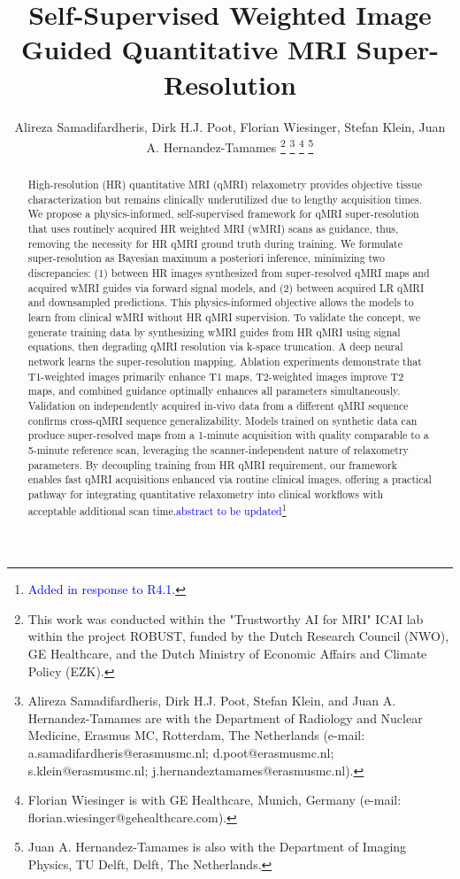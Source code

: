 \documentclass[journal,twoside,web]{ieeecolor}
\newcommand{\added}[1]{\textcolor{blue}{#1}}      %
\begin{document}
\title{Self-Supervised Weighted Image Guided Quantitative MRI Super-Resolution}
\author{
    Alireza Samadifardheris, 
    Dirk H.J. Poot, 
    Florian Wiesinger, 
    Stefan Klein, 
    Juan A. Hernandez-Tamames
    \thanks{This work was conducted within the "Trustworthy AI for MRI" ICAI lab within the project ROBUST, funded by the Dutch Research Council (NWO), GE Healthcare, and the Dutch Ministry of Economic Affairs and Climate Policy (EZK).}
    \thanks{Alireza Samadifardheris, Dirk H.J. Poot, Stefan Klein, and Juan A. Hernandez-Tamames are with the Department of Radiology and Nuclear Medicine, Erasmus MC, Rotterdam, The Netherlands (e-mail: a.samadifardheris@erasmusmc.nl; d.poot@erasmusmc.nl; s.klein@erasmusmc.nl; j.hernandeztamames@erasmusmc.nl).}
    \thanks{Florian Wiesinger is with GE Healthcare, Munich, Germany (e-mail: florian.wiesinger@gehealthcare.com).}
    \thanks{Juan A. Hernandez-Tamames is also with the Department of Imaging Physics, TU Delft, Delft, The Netherlands.}
}

\maketitle

\begin{abstract}
High-resolution (HR) quantitative MRI (qMRI) relaxometry provides objective tissue characterization but remains clinically underutilized due to lengthy acquisition times. We propose a physics-informed, self-supervised framework for qMRI super-resolution that uses routinely acquired HR weighted MRI (wMRI) scans as guidance, thus, removing the necessity for HR qMRI ground truth during training. We formulate super-resolution as Bayesian maximum a posteriori inference, minimizing two discrepancies: (1) between HR images synthesized from super-resolved qMRI maps and acquired wMRI guides via forward signal models, and (2) between acquired LR qMRI and downsampled predictions. This physics-informed objective allows the models to learn from clinical wMRI without HR qMRI supervision. To validate the concept, we generate training data by synthesizing wMRI guides from HR qMRI using signal equations, then degrading qMRI resolution via k-space truncation. A deep neural network learns the super-resolution mapping. Ablation experiments demonstrate that T1-weighted images primarily enhance T1 maps, T2-weighted images improve T2 maps, and combined guidance optimally enhances all parameters simultaneously. Validation on independently acquired in-vivo data from a different qMRI sequence confirms cross-qMRI sequence generalizability. Models trained on synthetic data can produce super-resolved maps from a 1-minute acquisition with quality comparable to a 5-minute reference scan, leveraging the scanner-independent nature of relaxometry parameters. By decoupling training from HR qMRI requirement, our framework enables fast qMRI acquisitions enhanced via routine clinical images, offering a practical pathway for integrating quantitative relaxometry into clinical workflows with acceptable additional scan time.\added{abstract to be updated\footnote{\textcolor{blue}{Added in response to R4.1.}}}
\end{abstract}
\end{document}
